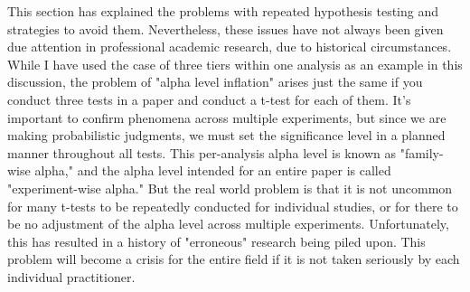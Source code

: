 \documentclass{ltjbook}
\begin{document}
This section has explained the problems with repeated hypothesis testing and strategies to avoid them. Nevertheless, these issues have not always been given due attention in professional academic research, due to historical circumstances. While I have used the case of three tiers within one analysis as an example in this discussion, the problem of "alpha level inflation" arises just the same if you conduct three tests in a paper and conduct a t-test for each of them. It's important to confirm phenomena across multiple experiments, but since we are making probabilistic judgments, we must set the significance level in a planned manner throughout all tests. This per-analysis alpha level is known as "family-wise alpha," and the alpha level intended for an entire paper is called "experiment-wise alpha." But the real world problem is that it is not uncommon for many t-tests to be repeatedly conducted for individual studies, or for there to be no adjustment of the alpha level across multiple experiments. Unfortunately, this has resulted in a history of "erroneous" research being piled upon. This problem will become a crisis for the entire field if it is not taken seriously by each individual practitioner.
\end{document}
